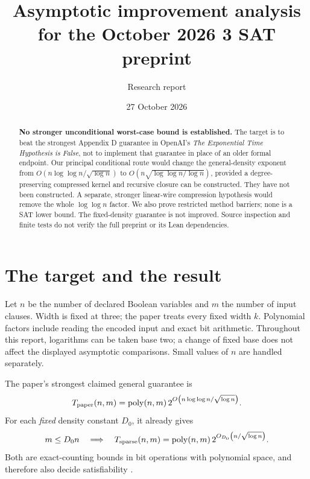 \documentclass[11pt,letterpaper]{article}
\title{\vspace{-1.4em}Asymptotic improvement analysis\\for the October 2026 3 SAT preprint}
\author{Research report}
\date{27 October 2026}
\newcommand{\poly}{\operatorname{poly}}
\theoremstyle{remark}\newtheorem*{scope}{Scope}
\begin{document}
\maketitle
\vspace{-1.6em}
\begin{abstract}
\noindent
\textbf{No stronger unconditional worst-case bound is established.} The target is to beat the strongest Appendix D guarantee in OpenAI's \emph{The Exponential Time Hypothesis is False}, not to implement that guarantee in place of an older formal endpoint. Our principal conditional route would change the general-density exponent from $O(n\log\log n/\sqrt{\log n})$ to $O(n\sqrt{\log\log n/\log n})$, provided a degree-preserving compressed kernel and recursive closure can be constructed. They have not been constructed. A separate, stronger linear-wire compression hypothesis would remove the whole $\log\log n$ factor. We also prove restricted method barriers; none is a SAT lower bound. The fixed-density guarantee is not improved. Source inspection and finite tests do not verify the full preprint or its Lean dependencies.
\end{abstract}

\section{The target and the result}
Let $n$ be the number of declared Boolean variables and $m$ the number of input clauses. Width is fixed at three; the paper treats every fixed width $k$. Polynomial factors include reading the encoded input and exact bit arithmetic. Throughout this report, logarithms can be taken base two; a change of fixed base does not affect the displayed asymptotic comparisons. Small values of $n$ are handled separately.

The paper's strongest claimed general guarantee is
\begin{equation}\label{eq:baseline}
 T_{\rm paper}(n,m)=\poly(n,m)\,
 2^{O\left(n\log\log n/\sqrt{\log n}\right)}.
\end{equation}
For each \emph{fixed} density constant $D_0$, it already gives
\begin{equation}\label{eq:sparse}
 m\le D_0 n\quad\Longrightarrow\quad
 T_{\rm sparse}(n,m)=\poly(n,m)\,
 2^{O_{D_0}\left(n/\sqrt{\log n}\right)}.
\end{equation}
Both are exact-counting bounds in bit operations with polynomial space, and therefore also decide satisfiability \cite{paper}.
\end{document}
